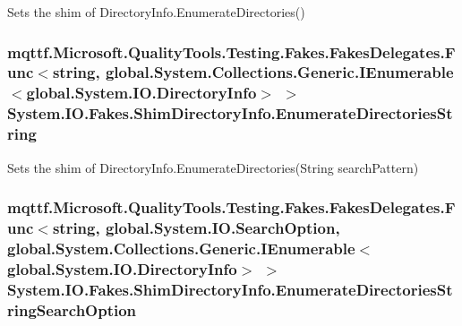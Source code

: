 Sets the shim of Directory\-Info.\-Enumerate\-Directories()

\hypertarget{class_system_1_1_i_o_1_1_fakes_1_1_shim_directory_info_a428b4c438938e7a6aabfb56a388ab480}{
\subsubsection[{Enumerate\-Directories\-String}]{\setlength{\rightskip}{0pt plus 5cm}mqttf.\-Microsoft.\-Quality\-Tools.\-Testing.\-Fakes.\-Fakes\-Delegates.\-Func$<$string, global.\-System.\-Collections.\-Generic.\-I\-Enumerable$<$global.\-System.\-I\-O.\-Directory\-Info$>$ $>$ System.\-I\-O.\-Fakes.\-Shim\-Directory\-Info.\-Enumerate\-Directories\-String\hspace{0.3cm}{\ttfamily [set]}}}\label{class_system_1_1_i_o_1_1_fakes_1_1_shim_directory_info_a428b4c438938e7a6aabfb56a388ab480}


Sets the shim of Directory\-Info.\-Enumerate\-Directories(\-String search\-Pattern)

\hypertarget{class_system_1_1_i_o_1_1_fakes_1_1_shim_directory_info_a66792f9a6cccd9b875e70f21ccdf0678}{
\subsubsection[{Enumerate\-Directories\-String\-Search\-Option}]{\setlength{\rightskip}{0pt plus 5cm}mqttf.\-Microsoft.\-Quality\-Tools.\-Testing.\-Fakes.\-Fakes\-Delegates.\-Func$<$string, global.\-System.\-I\-O.\-Search\-Option, global.\-System.\-Collections.\-Generic.\-I\-Enumerable$<$global.\-System.\-I\-O.\-Directory\-Info$>$ $>$ System.\-I\-O.\-Fakes.\-Shim\-Directory\-Info.\-Enumerate\-Directories\-String\-Search\-Option\hspace{0.3cm}{\ttfamily [set]}}}\label{class_system_1_1_i_o_1_1_fakes_1_1_shim_directory_info_a66792f9a6cccd9b875e70f21ccdf0678}



